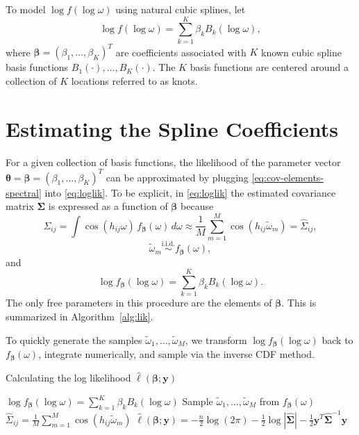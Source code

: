 To model $\log f(\log \omega)$ using natural cubic splines, let
\begin{equation} \label{eq:spline}
	\log f(\log \omega) = \sum_{k=1}^K \beta_k B_k(\log \omega),
\end{equation}
where $\bm{\beta} = (\beta_1, \dots, \beta_K)^T$ are coefficients associated with $K$ known cubic spline basis functions $B_1(\cdot), \dots, B_K(\cdot)$. The $K$ basis functions are centered around a collection of $K$ locations referred to as knots.



\section{Estimating the Spline Coefficients} %
\label{sec:estimating_the_spline_coefficients}


For a given collection of basis functions, the likelihood of the parameter vector $\bm{\theta} = \bm{\beta} = (\beta_1, \dots, \beta_K)^T$ can be approximated by plugging \eqref{eq:cov-elements-spectral} into \eqref{eq:loglik}. To be explicit, in \eqref{eq:loglik} the estimated covariance matrix $\bm{\Sigma}$ is expressed as a function of $\bm{\beta}$ because
\[
	\Sigma_{ij} = \int \cos(h_{ij}\omega) \, f_{\bm{\beta}}(\omega) \, d\omega \approx  \frac{1}{M} \sum_{m=1}^M \cos(h_{ij} \widetilde{\omega}_m) = \widehat{\Sigma}_{ij},
\]
\[
	\widetilde{\omega}_m \overset{\textrm{i.i.d.}}{\sim} f_{\bm{\beta}}(\omega),
\]
and
\[
	\log f_{\bm{\beta}}(\log \omega) = \sum_{k=1}^K \beta_k B_k(\log \omega).
\]
The only free parameters in this procedure are the elements of $\bm{\beta}$. This is summarized in Algorithm~\ref{alg:lik}.

To quickly generate the samples $\widetilde{\omega}_1, \ldots, \widetilde{\omega}_M$, we transform $\log f_{\bm{\beta}}(\log \omega)$ back to $f_{\bm{\beta}}(\omega)$, integrate numerically, and sample via the inverse CDF method.

\begin{algorithm}[!htb]
	\caption{\small Calculating the log likelihood $\hat{\ell}(\bm{\beta}; \bm{y})$} \label{alg:lik}
	\begin{algorithmic}[1]
		\State $\log f_{\bm{\beta}}(\log \omega) = \sum_{k=1}^K \beta_k B_k(\log \omega)$
		\State Sample $\widetilde{\omega}_1, \dots, \widetilde{\omega}_M$ from $f_{\bm{\beta}}(\omega)$
			\State $\widehat{\Sigma}_{ij} = \frac{1}{M} \sum_{m=1}^M \cos(h_{ij} \widetilde{\omega}_m)$
		\EndFor
		\State $\hat{\ell}(\bm{\beta}; \bm{y}) = -\frac{n}{2} \log(2\pi) - \frac{1}{2} \log |\widehat{\bm{\Sigma}}| - \frac{1}{2} \bm{y}^T \widehat{\bm{\Sigma}}^{-1} \bm{y}$
		\EndProcedure
	\end{algorithmic}
\end{algorithm}

